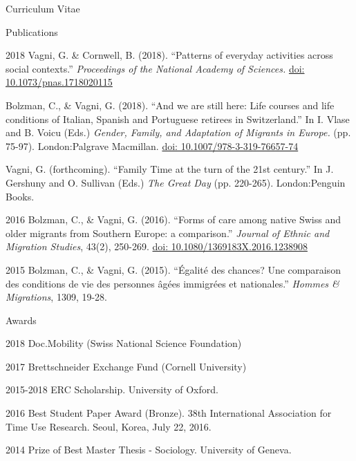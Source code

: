 \documentclass[12pt,a4paper]{article}
\begin{document}
\begin{cv}{Curriculum Vitae}
 
 \newpage
 
   \begin{cvlist}{Publications}
	
		 \item [2018] Vagni, G. \& Cornwell, B. (2018). ``Patterns of everyday activities across social contexts.'' \emph{Proceedings of the National Academy of Sciences.} \href{https://doi.org/10.1073/pnas.1718020115}{doi: 10.1073/pnas.1718020115} 
		 
		   \item [] Bolzman, C., \& Vagni, G. (2018). ``And we are still here: Life courses and life conditions of Italian, Spanish and Portuguese retirees in Switzerland.'' In I. Vlase and B. Voicu (Eds.) \emph{Gender, Family, and Adaptation of Migrants in Europe.} (pp. 75-97). London:Palgrave Macmillan. \href{https://doi.org/10.1007/978-3-319-76657-7_4}{doi: 10.1007/978-3-319-76657-74} 
		    	 	 
   	 	  \item [] Vagni, G. (forthcoming). ``Family Time at the turn of the 21st century.'' In J. Gershuny and O. Sullivan (Eds.) \emph{The Great Day} (pp. 220-265). London:Penguin Books.  
   	 	    	 	    	 
   	\item [2016] Bolzman, C., \& Vagni, G. (2016). ``Forms of care among native Swiss and older migrants from Southern Europe: a comparison.'' \emph{Journal of Ethnic and Migration Studies}, 43(2), 250-269. 
   	\href{https://doi.org/10.1080/1369183X.2016.1238908}{doi: 10.1080/1369183X.2016.1238908} 

   	
   	\item [2015]
   	Bolzman, C., \& Vagni, G. (2015). ``{\'E}galit{\'e} des chances? Une
   	comparaison des conditions de vie des personnes {\^a}g{\'e}es immigr{\'e}es
   	et nationales.'' \emph{Hommes \& Migrations}, 1309, 19-28.
   \end{cvlist}
 
 
    \begin{cvlist}{Awards}
    	\item[2018]  Doc.Mobility (Swiss National Science Foundation)
    	\item[2017]  Brettschneider Exchange Fund (Cornell University)
    	\item [2015-2018] ERC Scholarship. University of Oxford. 
    	\item [2016]  Best Student Paper Award (Bronze). 38th International Association for Time Use Research. Seoul, Korea, July 22, 2016. 
    	\item [2014] Prize of Best Master Thesis - Sociology.  University of Geneva. 
    \end{cvlist}


\end{cv}
\end{document}
